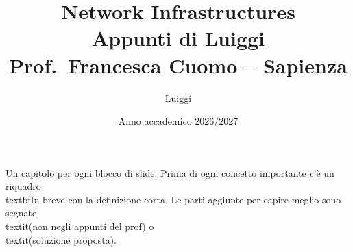 \documentclass[11pt,a4paper]{report}
\title{\textbf{Network Infrastructures}\\[0.5em]\large Appunti di Luiggi\\[0.3em]\normalsize Prof.\ Francesca Cuomo -- Sapienza}
\author{Luiggi}
\date{Anno accademico 2026/2027}
\begin{document}
\maketitle

\noindent Un capitolo per ogni blocco di slide. Prima di ogni concetto importante c'è un riquadro \\textbf{In breve} con la definizione corta. Le parti aggiunte per capire meglio sono segnate \\textit{(non negli appunti del prof)} o \\textit{(soluzione proposta)}.

\tableofcontents





\appendix

\end{document}
